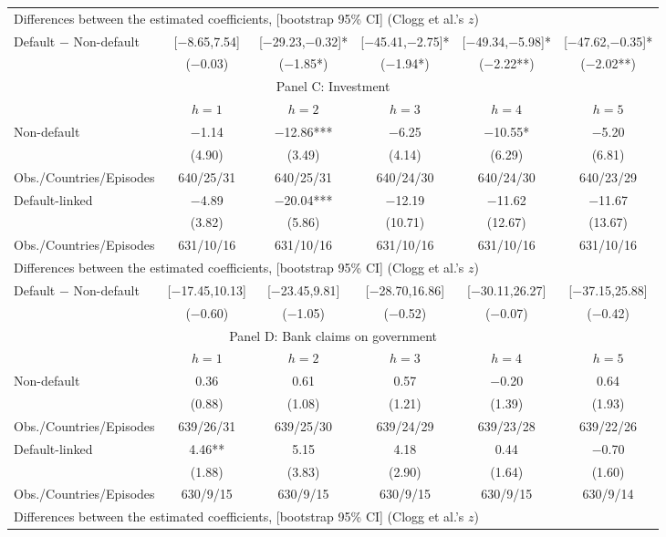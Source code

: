 \documentclass[12pt]{article}
\begin{document}
\begin{longtable}{lccccc}
\multicolumn{6}{l}{Differences between the estimated coefficients, [bootstrap 95\% CI] (Clogg et al.'s $z$)} \\[2pt]
Default $-$ Non-default & [$-$8.65,7.54] & [$-$29.23,$-$0.32]* & [$-$45.41,$-$2.75]* & [$-$49.34,$-$5.98]* & [$-$47.62,$-$0.35]* \\
 & ($-$0.03) & ($-$1.85*) & ($-$1.94*) & ($-$2.22**) & ($-$2.02**) \\[5pt]
\multicolumn{6}{c}{\large Panel C: Investment} \\
\toprule
 & $h=1$ & $h=2$ & $h=3$ & $h=4$ & $h=5$ \\
\midrule
Non-default & $-$1.14 & $-$12.86*** & $-$6.25 & $-$10.55* & $-$5.20 \\
 & (4.90) & (3.49) & (4.14) & (6.29) & (6.81) \\[1pt]
Obs./Countries/Episodes & 640/25/31 & 640/25/31 & 640/24/30 & 640/24/30 & 640/23/29 \\[3pt]
Default-linked & $-$4.89 & $-$20.04*** & $-$12.19 & $-$11.62 & $-$11.67 \\
 & (3.82) & (5.86) & (10.71) & (12.67) & (13.67) \\[1pt]
Obs./Countries/Episodes & 631/10/16 & 631/10/16 & 631/10/16 & 631/10/16 & 631/10/16 \\[4pt]
\multicolumn{6}{l}{Differences between the estimated coefficients, [bootstrap 95\% CI] (Clogg et al.'s $z$)} \\[2pt]
Default $-$ Non-default & [$-$17.45,10.13] & [$-$23.45,9.81] & [$-$28.70,16.86] & [$-$30.11,26.27] & [$-$37.15,25.88] \\
 & ($-$0.60) & ($-$1.05) & ($-$0.52) & ($-$0.07) & ($-$0.42) \\[5pt]
\multicolumn{6}{c}{\large Panel D: Bank claims on government} \\
\toprule
 & $h=1$ & $h=2$ & $h=3$ & $h=4$ & $h=5$ \\
\midrule
Non-default & 0.36 & 0.61 & 0.57 & $-$0.20 & 0.64 \\
 & (0.88) & (1.08) & (1.21) & (1.39) & (1.93) \\[1pt]
Obs./Countries/Episodes & 639/26/31 & 639/25/30 & 639/24/29 & 639/23/28 & 639/22/26 \\[3pt]
Default-linked & 4.46** & 5.15 & 4.18 & 0.44 & $-$0.70 \\
 & (1.88) & (3.83) & (2.90) & (1.64) & (1.60) \\[1pt]
Obs./Countries/Episodes & 630/9/15 & 630/9/15 & 630/9/15 & 630/9/15 & 630/9/14 \\[4pt]
\multicolumn{6}{l}{Differences between the estimated coefficients, [bootstrap 95\% CI] (Clogg et al.'s $z$)} \\[2pt]

\end{longtable}
\end{document}
